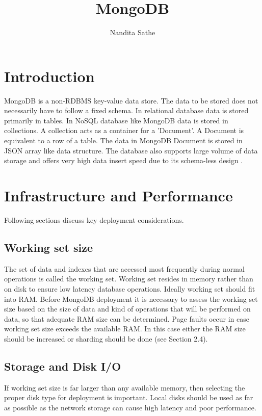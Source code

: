 \documentclass[9pt,twocolumn,twoside]{../../styles/osajnl}
\title{MongoDB}
\author[1,*]{Nandita Sathe}
\affil[1]{School of Informatics and Computing, Bloomington, IN 47408, U.S.A.}
\affil[*]{Corresponding author: nsathe@iu.edu}
\begin{document}
\maketitle

\section{Introduction}

MongoDB is a non-RDBMS key-value data store. The data to be stored does not necessarily have to follow a fixed schema. In relational database data is stored primarily in tables. In NoSQL database like MongoDB data is stored in collections. A collection acts as a container for a 'Document'. A Document is equivalent to a row of a table. The data in MongoDB Document is stored in JSON array like data structure. The database also supports large volume of data storage and offers very high data insert speed due to its schema-less design \cite{paper-mongo1}. 

\section{Infrastructure and Performance}

Following sections discuss key deployment considerations.

\subsection{Working set size}

The set of data and indexes that are accessed most frequently during normal operations is called the working set. Working set resides in memory rather than on disk to ensure low latency database operations. Ideally working set should fit into RAM. Before MongoDB deployment it is necessary to assess the working set size based on the size of data and kind of operations that will be performed on data, so that adequate RAM size can be determined. Page faults occur in case working set size exceeds the available RAM. In this case either the RAM size should be increased or sharding should be done (see Section 2.4).   

\subsection {Storage and Disk I/O}

If working set size is far larger than any available memory, then selecting the proper disk type for deployment is important. Local disks should be used as far as possible as the network storage can cause high latency and poor performance.
\end{document}
